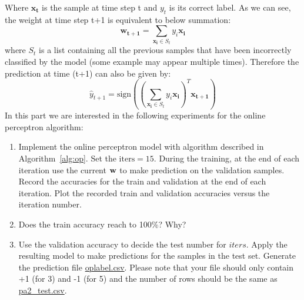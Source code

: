 \documentclass{article}
\begin{document}
{Where $\bm{x_t}$ is the sample at time step t and $y_t$ is its correct label. As we can see, the weight at time step t+1 is equivalent to below summation:\\
\begin{equation}
    \bm{w_{t+1}} = \sum_{\bm{x_i}\in S_t} y_i\bm{x_i}
\end{equation}
where $S_t$ is a list containing all the previous samples that have been incorrectly classified by the model (some example may appear multiple times).  Therefore the prediction at time (t+1) can also be given by:\\
\begin{equation}
    \hat{y}_{t+1} = \mbox{sign}((\sum_{\bm{x_i}\in S_t} y_i\bm{x_i})^{T}\bm{x_{t+1}})
\end{equation}
In this part we are interested in the following experiments for the online perceptron algorithm:
\begin{enumerate}
\item Implement the online perceptron model with algorithm described in Algorithm~\ref{alg:op}.  Set the $\mbox{iters}=15$. During the training, at the end of each iteration use the current $\bf w$ to make prediction on the validation samples. Record the accuracies for the train and validation at the end of each iteration. Plot the recorded train and validation accuracies versus the iteration number.
\item Does the train accuracy reach to 100\%? Why?
\item Use the validation accuracy to decide the test number for $iters$. Apply the resulting model to make predictions for the samples in the test set. Generate the prediction file \underline{oplabel.csv}. Please note that your file should only contain +1 (for 3) and -1 (for 5) and the number of rows should be the same as \underline{pa2\_test.csv}. 
\end{enumerate}
}
\end{document}
